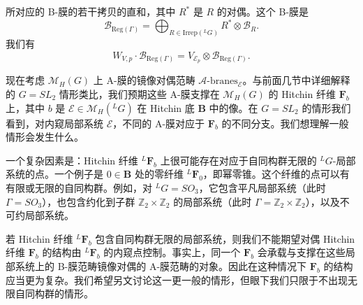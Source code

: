 \documentclass[11pt,a4paper]{article}
\begin{document}
所对应的 B-膜的若干拷贝的直和，其中 $R^*$ 是 $R$ 的对偶。这个 B-膜是
\begin{equation}\tag{9.3}
\mathcal{B}_{\mathrm{Reg}(\Gamma)} = \bigoplus_{R\in\mathrm{Irrep}({}^{L}G)}R^*\otimes\mathcal{B}_R.
\end{equation}
我们有
\begin{equation}\tag{9.4}
W_{V,p}\cdot\mathcal{B}_{\mathrm{Reg}(\Gamma)} = V_{\mathcal{E}_p}\otimes\mathcal{B}_{\mathrm{Reg}(\Gamma)}.
\end{equation}

现在考虑 $\mathcal{M}_H(G)$ 上 A-膜的镜像对偶范畴 $\mathcal{A}\text{-branes}_{\mathcal{E}}$。与前面几节中详细解释的 $G=SL_2$ 情形类比，我们预期这些 A-膜支撑在 $\mathcal{M}_H(G)$ 的 Hitchin 纤维 $\boldsymbol{F}_b$ 上，其中 $b$ 是 $\mathcal{E}\in\mathcal{M}_H({}^{L}G)$ 在 Hitchin 底 $\boldsymbol{B}$ 中的像。在 $G=SL_2$ 的情形我们看到，对内窥局部系统 $\mathcal{E}$，不同的 A-膜对应于 $\boldsymbol{F}_b$ 的不同分支。我们想理解一般情形会发生什么。

一个复杂因素是：Hitchin 纤维 ${}^{L}\boldsymbol{F}_b$ 上很可能存在对应于自同构群无限的 ${}^{L}G$-局部系统的点。一个例子是 $0\in\boldsymbol{B}$ 处的零纤维 ${}^{L}\boldsymbol{F}_0$，即幂零锥。这个纤维的点可以有有限或无限的自同构群。例如，对 ${}^{L}G=SO_3$，它包含平凡局部系统（此时 $\Gamma=SO_3$），也包含约化到子群 $\mathbb{Z}_2\times\mathbb{Z}_2$ 的局部系统（此时 $\Gamma=\mathbb{Z}_2\times\mathbb{Z}_2$），以及不可约局部系统。

若 Hitchin 纤维 ${}^{L}\boldsymbol{F}_b$ 包含自同构群无限的局部系统，则我们不能期望对偶 Hitchin 纤维 $\boldsymbol{F}_b$ 的结构由 ${}^{L}\boldsymbol{F}_b$ 的内窥点控制。事实上，同一个 $\boldsymbol{F}_b$ 会承载与支撑在这些局部系统上的 B-膜范畴镜像对偶的 A-膜范畴的对象。因此在这种情况下 $\boldsymbol{F}_b$ 的结构应当更为复杂。我们希望另文讨论这一更一般的情形，但眼下我们只限于不出现无限自同构群的情形。
\end{document}

